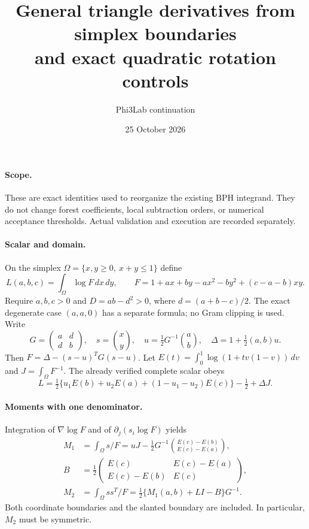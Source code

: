 \documentclass[11pt]{article}
\title{General triangle derivatives from simplex boundaries\\and exact quadratic rotation controls}
\author{Phi3Lab continuation}
\date{25 October 2026}
\begin{document}
\maketitle
\paragraph{Scope.} These are exact identities used to reorganize the existing BPH integrand. They do not change forest coefficients, local subtraction orders, or numerical acceptance thresholds. Actual validation and execution are recorded separately.

\paragraph{Scalar and domain.}
On the simplex $\Omega=\{x,y\geq0,\ x+y\leq1\}$ define
\[
L(a,b,c)=\int_\Omega\log F\,dx\,dy,\qquad
F=1+ax+by-ax^2-by^2+(c-a-b)xy .
\]
Require $a,b,c>0$ and $D=ab-d^2>0$, where $d=(a+b-c)/2$.
The exact degenerate case $(a,a,0)$ has a separate formula; no Gram clipping is used. Write
\[
G=\begin{pmatrix}a&d\\d&b\end{pmatrix},\quad
s=\binom{x}{y},\quad u=\tfrac12G^{-1}\binom ab,\quad
\Delta=1+\tfrac12(a,b)u .
\]
Then $F=\Delta-(s-u)^TG(s-u)$.
Let $E(t)=\int_0^1\log(1+tv(1-v))\,dv$ and $J=\int_\Omega F^{-1}$.
The already verified complete scalar obeys
\[
L=\tfrac12\{u_1E(b)+u_2E(a)+(1-u_1-u_2)E(c)\}
-\tfrac12+\Delta J .
\]

\paragraph{Moments with one denominator.}
Integration of $\nabla\log F$ and of $\partial_j(s_i\log F)$ yields
\begin{align*}
M_1&=\int_\Omega s/F
=uJ-\tfrac12G^{-1}\binom{E(c)-E(b)}{E(c)-E(a)},\\
B&=\tfrac12\begin{pmatrix}E(c)&E(c)-E(a)\\E(c)-E(b)&E(c)\end{pmatrix},\\
M_2&=\int_\Omega ss^T/F
=\tfrac12\{M_1(a,b)+LI-B\}G^{-1}.
\end{align*}
Both coordinate boundaries and the slanted boundary are included. In particular, $M_2$ must be symmetric.
\end{document}
